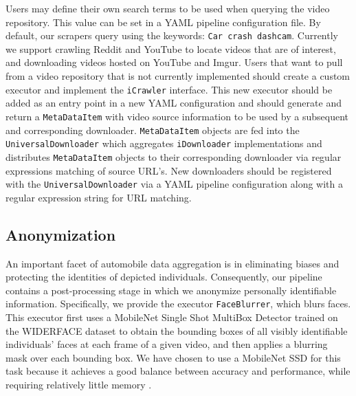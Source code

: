 \documentclass[letterpaper, 10 pt, conference]{ieeeconf}
\newcommand{\todo}[1]{{\color{red}#1}}
\begin{document}
Users may define their own search terms to be used when querying the video repository. This value can be set in a YAML pipeline configuration file. By default, our scrapers query using the keywords: \texttt{Car crash dashcam}. Currently we support crawling Reddit and YouTube to locate videos that are of interest, and downloading videos hosted on YouTube and Imgur. Users that want to pull from a video repository that is not currently implemented should create a custom executor and implement the \texttt{iCrawler} interface. This new executor should be added as an entry point in a new YAML configuration and should generate and return a \texttt{MetaDataItem} with video source information to be used by a subsequent and corresponding downloader. \texttt{MetaDataItem} objects are fed into the \texttt{UniversalDownloader} which aggregates \texttt{iDownloader} implementations and distributes \texttt{MetaDataItem} objects to their corresponding downloader via regular expressions matching of source URL's. New downloaders should be registered with the \texttt{UniversalDownloader} via a YAML pipeline configuration along with a regular expression string for URL matching.

\subsection{Anonymization}
An important facet of automobile data aggregation is in eliminating biases and protecting the identities of depicted individuals. Consequently, our pipeline contains a post-processing stage in which we anonymize personally identifiable information. Specifically, we provide the executor \texttt{FaceBlurrer}, which blurs faces. This executor first uses a MobileNet Single Shot MultiBox Detector \cite{yixuan_h_y_hu_2021_4642275} trained on the WIDERFACE dataset \cite{yang2016wider} to obtain the bounding boxes of all visibly identifiable individuals' faces at each frame of a given video, and then applies a blurring mask over each bounding box. We have chosen to use a MobileNet SSD for this task because it achieves a good balance between accuracy and performance, while requiring relatively little memory \cite{yixuan_h_y_hu_2021_4642275}.
\end{document}
